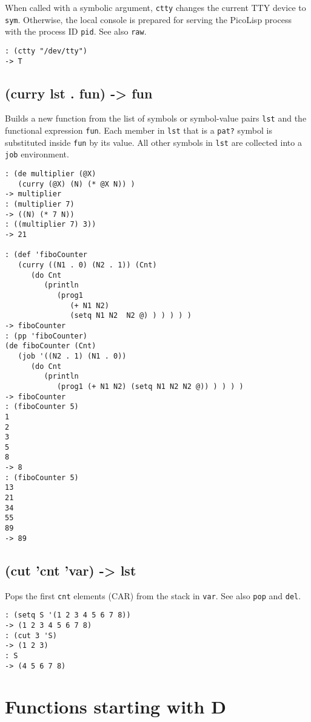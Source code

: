 {When called with a symbolic argument, \texttt{ctty} changes the current TTY
device to \texttt{sym}. Otherwise, the local console is prepared for serving
the PicoLisp process with the process ID \texttt{pid}. See also \texttt{raw}.


\begin{verbatim}
: (ctty "/dev/tty")
-> T
\end{verbatim}

 
\section{(curry lst . fun) -> fun}
\label{sec-8-1-3-39}


Builds a new function from the list of symbols or symbol-value pairs
\texttt{lst} and the functional expression \texttt{fun}. Each member in \texttt{lst} that is
a \texttt{pat?} symbol is substituted inside \texttt{fun} by its value. All other
symbols in \texttt{lst} are collected into a \texttt{job} environment.


\begin{verbatim}
: (de multiplier (@X)
   (curry (@X) (N) (* @X N)) )
-> multiplier
: (multiplier 7)
-> ((N) (* 7 N))
: ((multiplier 7) 3))
-> 21

: (def 'fiboCounter
   (curry ((N1 . 0) (N2 . 1)) (Cnt)
      (do Cnt
         (println
            (prog1
               (+ N1 N2)
               (setq N1 N2  N2 @) ) ) ) ) )
-> fiboCounter
: (pp 'fiboCounter)
(de fiboCounter (Cnt)
   (job '((N2 . 1) (N1 . 0))
      (do Cnt
         (println
            (prog1 (+ N1 N2) (setq N1 N2 N2 @)) ) ) ) )
-> fiboCounter
: (fiboCounter 5)
1
2
3
5
8
-> 8
: (fiboCounter 5)
13
21
34
55
89
-> 89
\end{verbatim}

 
\section{(cut 'cnt 'var) -> lst}
\label{sec-8-1-3-40}


Pops the first \texttt{cnt} elements (CAR) from the stack in \texttt{var}. See also
\texttt{pop} and \texttt{del}.


\begin{verbatim}
: (setq S '(1 2 3 4 5 6 7 8))
-> (1 2 3 4 5 6 7 8)
: (cut 3 'S)
-> (1 2 3)
: S
-> (4 5 6 7 8)
\end{verbatim}


\chapter{Functions starting with D}
\label{sec-8-1-4}


}
